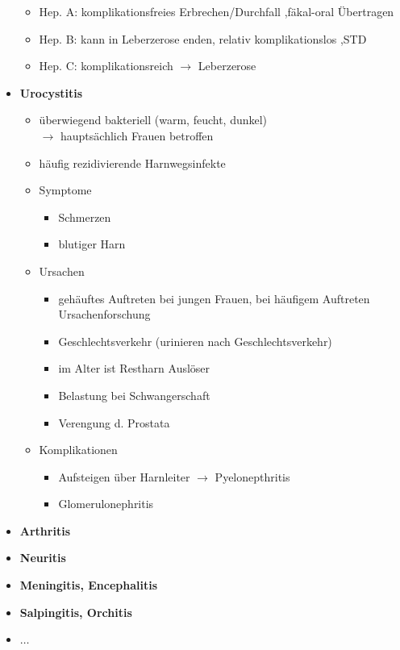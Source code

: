 \begin{itemize}
				\begin{itemize}
					\item Hep. A: komplikationsfreies Erbrechen/Durchfall ,fäkal-oral Übertragen
					\item Hep. B: kann in Leberzerose enden, relativ komplikationslos ,STD
					\item Hep. C: komplikationsreich $\rightarrow$ Leberzerose
				\end{itemize}
			\item \textbf{Urocystitis}
				\begin{itemize}
					\item überwiegend bakteriell (warm, feucht, dunkel)\\
						$\rightarrow$ hauptsächlich Frauen betroffen
					\item häufig rezidivierende Harnwegsinfekte
					\item Symptome
						\begin{itemize}
							\item Schmerzen
							\item blutiger Harn
						\end{itemize}
					\item Ursachen
						\begin{itemize}
							\item gehäuftes Auftreten bei jungen Frauen, bei häufigem Auftreten Ursachenforschung
							\item Geschlechtsverkehr (urinieren nach Geschlechtsverkehr)
							\item im Alter ist Restharn Auslöser
							\item Belastung bei Schwangerschaft
							\item Verengung d. Prostata
						\end{itemize}
					\item Komplikationen
						\begin{itemize}
							\item Aufsteigen über Harnleiter $\rightarrow$ Pyelonepthritis
							\item Glomerulonephritis
						\end{itemize}
				\end{itemize}
			\item \textbf{Arthritis}
			\item \textbf{Neuritis}
			\item \textbf{Meningitis, Encephalitis}
			\item \textbf{Salpingitis, Orchitis}
			\item \textbf{$\dots$}
	\end{itemize}